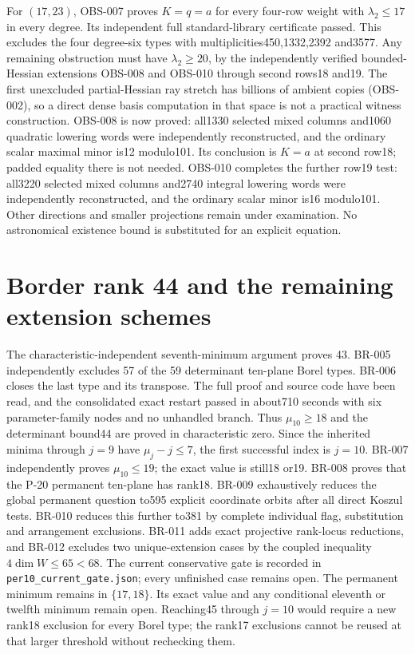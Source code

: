\documentclass[11pt]{article}
\begin{document}
For $(17,23)$, OBS-007 proves $K=q=a$ for every four-row weight
with $\lambda_2\le17$ in every degree. Its independent full
standard-library certificate passed. This excludes the four degree-six
types with multiplicities450,1332,2392 and3577. Any remaining
obstruction must have $\lambda_2\ge20$, by the independently
verified bounded-Hessian extensions OBS-008 and OBS-010 through
second rows18 and19.
The first unexcluded partial-Hessian ray stretch has billions of
ambient copies (OBS-002), so a direct dense basis computation in that
space is not a practical witness construction. OBS-008 is now proved: all1330 selected mixed columns and1060
quadratic lowering words were independently reconstructed, and the
ordinary scalar maximal minor is12 modulo101. Its conclusion is
$K=a$ at second row18; padded equality there is not needed.
OBS-010 completes the further row19 test: all3220 selected mixed
columns and2740 integral lowering words were independently reconstructed,
and the ordinary scalar minor is16 modulo101. Other directions and
smaller projections remain under examination. No astronomical
existence bound is substituted for an explicit equation.


\section{Border rank 44 and the remaining extension schemes}
The characteristic-independent seventh-minimum argument proves 43.
BR-005 independently excludes 57 of the 59 determinant ten-plane Borel
types. BR-006 closes the last type and its transpose. The full proof
and source code have been read, and the consolidated exact restart
passed in about710 seconds with six parameter-family nodes and no
unhandled branch. Thus $\mu_{10}\ge18$ and the determinant bound44
are proved in characteristic zero. Since the inherited minima through
$j=9$ have $\mu_j-j\le7$, the first successful index is $j=10$.
BR-007 independently proves $\mu_{10}\le19$; the exact value is
still18 or19.
BR-008 proves that the P-20 permanent ten-plane has rank18.
BR-009 exhaustively reduces the global permanent question to595
explicit coordinate orbits after all direct Koszul tests. BR-010
reduces this further to381 by complete individual flag, substitution
and arrangement exclusions. BR-011 adds exact projective rank-locus
reductions, and BR-012 excludes two unique-extension cases by the
coupled inequality $4\dim W\le65<68$. The current conservative gate
is recorded in \texttt{per10\_current\_gate.json}; every unfinished
case remains open. The permanent
minimum remains in $\{17,18\}$. Its exact value and
any conditional eleventh or twelfth minimum remain open.
Reaching45 through $j=10$ would require a new rank18 exclusion for
every Borel type; the rank17 exclusions cannot be reused at that
larger threshold without rechecking them.

\end{document}
